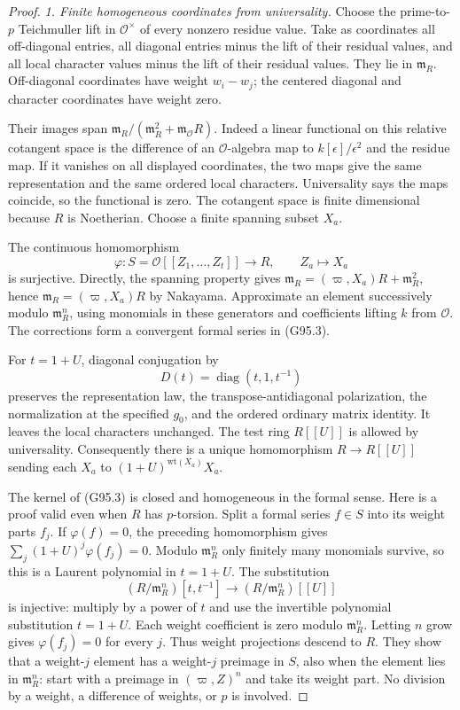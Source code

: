 \begin{proof}
\emph{1. Finite homogeneous coordinates from universality.}
Choose the prime-to-\(p\) Teichmuller lift in \(\mathcal O^\times\)
of every nonzero residue value.  Take as coordinates all off-diagonal
entries, all diagonal entries minus the lift of their residual
values, and all local character values minus the lift of their
residual values.  They lie in \(\mathfrak m_R\).
Off-diagonal coordinates have weight \(w_i-w_j\); the centered
diagonal and character coordinates have weight zero.

Their images span
\(\mathfrak m_R/(\mathfrak m_R^2+\mathfrak m_{\mathcal O}R)\).
Indeed a linear functional on this relative cotangent space is the
difference of an \(\mathcal O\)-algebra map to
\(k[\epsilon]/\epsilon^2\) and the residue map.
If it vanishes on all displayed coordinates, the two maps give
the same representation and the same ordered local characters.
Universality says the maps coincide, so the functional is zero.
The cotangent space is finite dimensional because \(R\) is
Noetherian.  Choose a finite spanning subset \(X_a\).

The continuous homomorphism
\[
 \varphi:S=\mathcal O[[Z_1,\ldots,Z_t]]\longrightarrow R,\qquad
 Z_a\longmapsto X_a
 \tag{G95.3}
\]
is surjective.  Directly, the spanning property gives
\(\mathfrak m_R=(\varpi,X_a)R+\mathfrak m_R^2\), hence
\(\mathfrak m_R=(\varpi,X_a)R\) by Nakayama.
Approximate an element successively modulo \(\mathfrak m_R^n\),
using monomials in these generators and coefficients lifting \(k\)
from \(\mathcal O\).  The corrections form a convergent formal
series in (G95.3).

For \(t=1+U\), diagonal conjugation by
\[
 D(t)=\operatorname{diag}(t,1,t^{-1})
 \tag{G95.4}
\]
preserves the representation law, the transpose-antidiagonal
polarization, the normalization at the specified \(g_0\), and the
ordered ordinary matrix identity.  It leaves the local characters
unchanged.  The test ring \(R[[U]]\) is allowed by universality.
Consequently there is a unique homomorphism \(R\to R[[U]]\)
sending each \(X_a\) to \((1+U)^{\mathrm{wt}(X_a)}X_a\).

The kernel of (G95.3) is closed and homogeneous in the formal
sense.  Here is a proof valid even when \(R\) has \(p\)-torsion.
Split a formal series \(f\in S\) into its weight parts \(f_j\).
If \(\varphi(f)=0\), the preceding homomorphism gives
\(\sum_j(1+U)^j\varphi(f_j)=0\).
Modulo \(\mathfrak m_R^n\) only finitely many monomials survive,
so this is a Laurent polynomial in \(t=1+U\).
The substitution
\[
 (R/\mathfrak m_R^n)[t,t^{-1}]
       \longrightarrow(R/\mathfrak m_R^n)[[U]]
 \tag{G95.5}
\]
is injective: multiply by a power of \(t\) and use the
invertible polynomial substitution \(t=1+U\).
Each weight coefficient is zero modulo \(\mathfrak m_R^n\).
Letting \(n\) grow gives \(\varphi(f_j)=0\) for every \(j\).
Thus weight projections descend to \(R\).
They show that a weight-\(j\) element has a weight-\(j\)
preimage in \(S\), also when the element lies in
\(\mathfrak m_R^n\): start with a preimage in
\((\varpi,Z)^n\) and take its weight part.
No division by a weight, a difference of weights, or \(p\)
is involved.


\end{proof}
